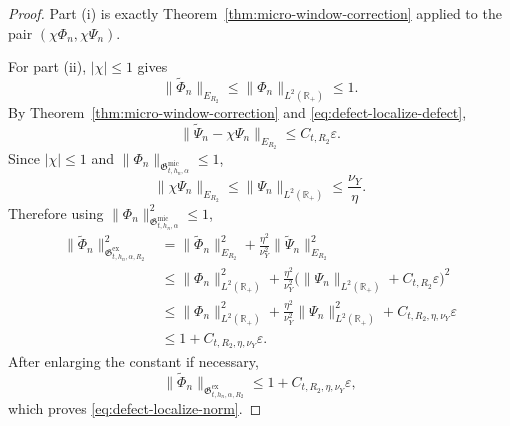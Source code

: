 \documentclass[11pt,a4paper]{amsart}
\theoremstyle{plain}
\theoremstyle{definition}
\theoremstyle{remark}
\newcommand{\R}{\mathbb{R}}
\begin{document}
\begin{proof}
Part (i) is exactly Theorem~\ref{thm:micro-window-correction} applied to the pair
\((\chi\Phi_n,\chi\Psi_n)\).

For part (ii), \(|\chi|\le1\) gives
\[
\|\widetilde\Phi_n\|_{E_{R_2}}
\le
\|\Phi_n\|_{L^2(\R_+)}
\le
1.
\]
By Theorem~\ref{thm:micro-window-correction} and \eqref{eq:defect-localize-defect},
\[
\|\widetilde\Psi_n-\chi\Psi_n\|_{E_{R_2}}
\le
C_{t,R_2}\varepsilon.
\]
Since \(|\chi|\le1\) and \(\|\Phi_n\|_{\mathfrak G_{t,h_n,\alpha}^{\mathrm{mic}}}\le1\),
\[
\|\chi\Psi_n\|_{E_{R_2}}
\le
\|\Psi_n\|_{L^2(\R_+)}
\le
\frac{\nu_Y}{\eta}.
\]
Therefore
using \(\|\Phi_n\|_{\mathfrak G_{t,h_n,\alpha}^{\mathrm{mic}}}^2\le1\),
\begin{align*}
\|\widetilde\Phi_n\|_{\mathfrak G_{t,h_n,\alpha,R_2}^{\mathrm{ex}}}^2
&=
\|\widetilde\Phi_n\|_{E_{R_2}}^2
+
\frac{\eta^2}{\nu_Y^2}\|\widetilde\Psi_n\|_{E_{R_2}}^2\\
&\le
\|\Phi_n\|_{L^2(\R_+)}^2
+
\frac{\eta^2}{\nu_Y^2}
\bigl(
\|\Psi_n\|_{L^2(\R_+)}+C_{t,R_2}\varepsilon
\bigr)^2\\
&\le
\|\Phi_n\|_{L^2(\R_+)}^2
+
\frac{\eta^2}{\nu_Y^2}\|\Psi_n\|_{L^2(\R_+)}^2
+
C_{t,R_2,\eta,\nu_Y}\varepsilon\\
&\le
1+C_{t,R_2,\eta,\nu_Y}\varepsilon.
\end{align*}
After enlarging the constant if necessary,
\[
\|\widetilde\Phi_n\|_{\mathfrak G_{t,h_n,\alpha,R_2}^{\mathrm{ex}}}
\le
1+C_{t,R_2,\eta,\nu_Y}\varepsilon,
\]
which proves \eqref{eq:defect-localize-norm}.


\end{proof}
\end{document}
